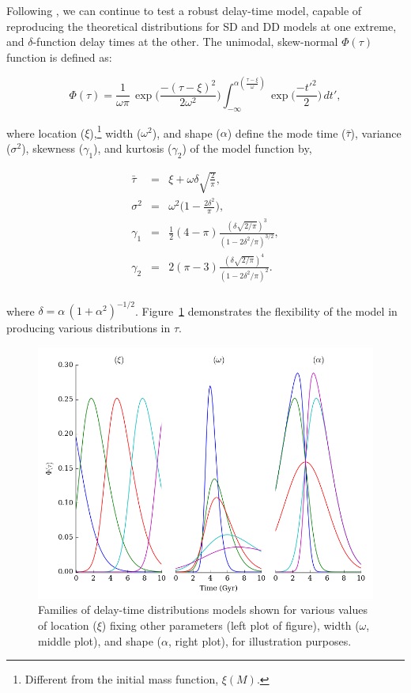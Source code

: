 \documentclass[apj]{aastex}
\begin{document}
Following \cite{Strolger:2010}, we can continue to test a robust delay-time model, capable of reproducing the theoretical distributions for SD and DD models at one extreme, and $\delta$-function delay times at the other. The unimodal, skew-normal $\Phi(\tau)$ function is defined as:

\begin{equation}
	\Phi(\tau)=\frac{1}{\omega\pi}\,\exp\biggl(\frac{-(\tau-\xi)^2}{2\omega^2}\biggr)\int_{-\infty}^{\alpha (\frac{\tau-\xi}{\omega})} \exp\biggl(\frac{-t'^2}{2}\biggr)\,dt',
\label{eqn:model}
\end{equation}

\noindent where location ($\xi$),\footnote{Different from the initial mass function, $\xi(M)$.} width ($\omega^2$), and shape ($\alpha$) define the mode time ($\bar{\tau}$), variance ($\sigma^2$), skewness ($\gamma_1$), and kurtosis ($\gamma_2$) of the model function by,

\begin{eqnarray*}
\bar{\tau}&=&\xi+\omega\delta\sqrt{\frac{2}{\pi}},\\
\sigma^2&=&\omega^2\biggl(1-\frac{2\delta^2}{\pi}\biggr),\\
\gamma_1&=&\frac{1}{2}(4-\pi)\frac{(\delta\sqrt{2/\pi})^3}{(1-2\delta^2/\pi)^{3/2}},\\
\gamma_2&=&2(\pi-3)\frac{(\delta\sqrt{2/\pi})^4}{(1-2\delta^2/\pi)^{2}}.\\
\end{eqnarray*}

where $\delta=\alpha\,(1+\alpha^2)^{-1/2}$. Figure~\ref{fig:dtd_families} demonstrates the flexibility of the model in producing various distributions in $\tau$. 

\begin{figure}[t]
   \centering
   \includegraphics[width=6.5in]{figure_dtd_families}
   \caption{\footnotesize Families of delay-time distributions models shown for various values of location ($\xi$) fixing other parameters (left plot of figure), width ($\omega$, middle plot), and shape ($\alpha$, right plot), for illustration purposes.}
   \label{fig:dtd_families}
\end{figure}
\end{document}
